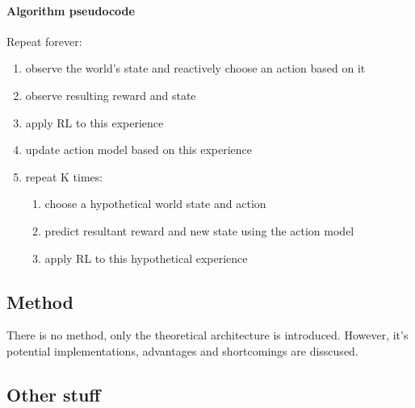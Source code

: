 \documentclass{article}
\begin{document}
\paragraph{Algorithm pseudocode}
Repeat forever:
\begin{enumerate}
		\item observe the world's state and reactively choose an action based on it
		\item observe resulting reward and state
		\item apply RL to this experience
		\item update action model based on this experience
		\item repeat K times:
				\begin{enumerate}
						\item choose a hypothetical world state and action
						\item predict resultant reward and new state using the action model
						\item apply RL to this hypothetical experience
				\end{enumerate}
\end{enumerate}



\subsection{Method}
There is no method, only the theoretical architecture is introduced.
However, it's potential implementations, advantages and shortcomings are disscused.

\subsection{Other stuff}
\end{document}

